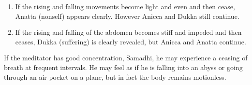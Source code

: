 \documentclass[a5paper,10pt,english]{book}
\begin{document}
\begin{enumerate}
\begin{enumerate}
\item {} 
\sphinxAtStartPar
If the rising and falling movements become light and even and then cease, Anatta (non\sphinxhyphen{}self) appears clearly. However Anicca and Dukka still continue.

\item {} 
\sphinxAtStartPar
If the rising and falling of the abdomen becomes stiff and impeded and then ceases, Dukka (suffering) is clearly revealed, but Anicca and Anatta continue.

\end{enumerate}

\end{enumerate}

\sphinxAtStartPar
If the meditator has good concentration, Samadhi, he may experience a ceasing of breath at frequent intervals. He may feel as if he is falling into an abyss or going through an air pocket on a plane, but in fact the body remains motionless.
\end{document}
